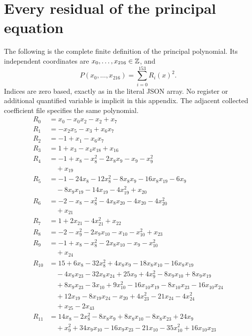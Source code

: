 \appendix
\section{Every residual of the principal equation}
\label{sec:residuals}
The following is the complete finite definition of the principal polynomial.
Its independent coordinates are $x_0,\ldots,x_{216}\in\mathbb Z$, and
\[P(x_0,\ldots,x_{216})=\sum_{i=0}^{153}R_i(x)^2.\]
Indices are zero based, exactly as in the literal JSON array. No register
or additional quantified variable is implicit in this appendix. The
adjacent collected coefficient file specifies the same polynomial.
\begingroup\small\setlength{\jot}{0.5pt}\allowdisplaybreaks[4]
\begin{align*}
R_{0}&=x_{0}-x_{0}x_{2}-x_{2}+x_{7}\\
R_{1}&=-x_{2}x_{5}-x_{3}+x_{6}x_{7}\\
R_{2}&=-1+x_{1}-x_{6}x_{7}\\
R_{3}&=1+x_{3}-x_{4}x_{18}+x_{16}\\
R_{4}&=-1+x_{8}-x_{8}^{2}-2x_{8}x_{9}-x_{9}-x_{9}^{2}\\
&\quad{}+x_{19}\\
R_{5}&=-1-24x_{8}-12x_{8}^{2}-8x_{8}x_{9}-16x_{8}x_{19}-6x_{9}\\
&\quad{}-8x_{9}x_{19}-14x_{19}-4x_{19}^{2}+x_{20}\\
R_{6}&=-2-x_{8}-x_{8}^{2}-4x_{8}x_{20}-4x_{20}-4x_{20}^{2}\\
&\quad{}+x_{21}\\
R_{7}&=1+2x_{21}-4x_{21}^{2}+x_{22}\\
R_{8}&=-2-x_{9}^{2}-2x_{9}x_{10}-x_{10}-x_{10}^{2}+x_{23}\\
R_{9}&=-1+x_{8}-x_{8}^{2}-2x_{8}x_{10}-x_{9}-x_{10}^{2}\\
&\quad{}+x_{24}\\
R_{10}&=15+6x_{8}-32x_{8}^{2}+4x_{8}x_{9}-18x_{8}x_{10}-16x_{8}x_{19}\\
&\quad{}-4x_{8}x_{23}-32x_{8}x_{24}+25x_{9}+4x_{9}^{2}-8x_{9}x_{10}+8x_{9}x_{19}\\
&\quad{}+8x_{9}x_{23}-3x_{10}+9x_{10}^{2}-16x_{10}x_{19}-8x_{10}x_{23}-16x_{10}x_{24}\\
&\quad{}+12x_{19}-8x_{19}x_{24}-x_{20}+4x_{23}^{2}-21x_{24}-4x_{24}^{2}\\
&\quad{}+x_{25}-2x_{43}\\
R_{11}&=14x_{8}-2x_{8}^{2}-8x_{8}x_{9}+8x_{8}x_{10}-8x_{8}x_{23}+24x_{9}\\
&\quad{}+x_{9}^{2}+34x_{9}x_{10}-16x_{9}x_{23}-21x_{10}-35x_{10}^{2}+16x_{10}x_{23}\\

\end{align*}
